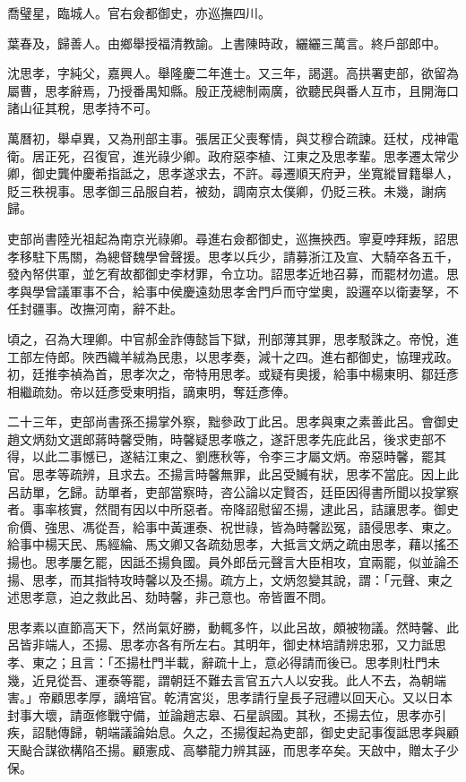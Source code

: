 \begin{pinyinscope}
喬璧星，臨城人。官右僉都御史，亦巡撫四川。

葉春及，歸善人。由鄉舉授福清教諭。上書陳時政，纚纚三萬言。終戶部郎中。

沈思孝，字純父，嘉興人。舉隆慶二年進士。又三年，謁選。高拱署吏部，欲留為屬曹，思孝辭焉，乃授番禺知縣。殷正茂總制兩廣，欲聽民與番人互市，且開海口諸山征其稅，思孝持不可。

萬曆初，舉卓異，又為刑部主事。張居正父喪奪情，與艾穆合疏諫。廷杖，戍神電衛。居正死，召復官，進光祿少卿。政府惡李植、江東之及思孝輩。思孝遷太常少卿，御史龔仲慶希指詆之，思孝遂求去，不許。尋遷順天府尹，坐寬縱冒籍舉人，貶三秩視事。思孝御三品服自若，被劾，調南京太僕卿，仍貶三秩。未幾，謝病歸。

吏部尚書陸光祖起為南京光祿卿。尋進右僉都御史，巡撫挾西。寧夏哱拜叛，詔思孝移駐下馬關，為總督魏學曾聲援。思孝以兵少，請募浙江及宣、大騎卒各五千，發內帑供軍，並乞宥故都御史李材罪，令立功。詔思孝近地召募，而罷材勿遣。思孝與學曾議軍事不合，給事中侯慶遠劾思孝舍門戶而守堂奧，設邏卒以衛妻孥，不任封疆事。改撫河南，辭不赴。

頃之，召為大理卿。中官郝金詐傳懿旨下獄，刑部薄其罪，思孝駁誅之。帝悅，進工部左侍郎。陜西織羊絨為民患，以思孝奏，減十之四。進右都御史，協理戎政。初，廷推李禎為首，思孝次之，帝特用思孝。或疑有奧援，給事中楊東明、鄒廷彥相繼疏劾。帝以廷彥受東明指，謫東明，奪廷彥俸。

二十三年，吏部尚書孫丕揚掌外察，黜參政丁此呂。思孝與東之素善此呂。會御史趙文炳劾文選郎蔣時馨受賄，時馨疑思孝嗾之，遂訐思孝先庇此呂，後求吏部不得，以此二事憾已，遂結江東之、劉應秋等，令李三才屬文炳。帝惡時馨，罷其官。思孝等疏辨，且求去。丕揚言時馨無罪，此呂受贓有狀，思孝不當庇。因上此呂訪單，乞歸。訪單者，吏部當察時，咨公論以定賢否，廷臣因得書所聞以投掌察者。事率核實，然間有因以中所惡者。帝降詔慰留丕揚，逮此呂，詰讓思孝。御史俞價、強思、馮從吾，給事中黃運泰、祝世祿，皆為時馨訟冤，語侵思孝、東之。給事中楊天民、馬經綸、馬文卿又各疏劾思孝，大抵言文炳之疏由思孝，藉以搖丕揚也。思孝屢乞罷，因詆丕揚負國。員外郎岳元聲言大臣相攻，宜兩罷，似並論丕揚、思孝，而其指特攻時馨以及丕揚。疏方上，文炳忽變其說，謂：「元聲、東之述思孝意，迫之救此呂、劾時馨，非己意也。帝皆置不問。

思孝素以直節高天下，然尚氣好勝，動輒多忤，以此呂故，頗被物議。然時馨、此呂皆非端人，丕揚、思孝亦各有所左右。其明年，御史林培請辨忠邪，又力詆思孝、東之；且言：「丕揚杜門半載，辭疏十上，意必得請而後已。思孝則杜門未幾，近見從吾、運泰等罷，謂朝廷不難去言官五六人以安我。此人不去，為朝端害。」帝顧思孝厚，謫培官。乾清宮災，思孝請行皇長子冠禮以回天心。又以日本封事大壞，請亟修戰守備，並論趙志皋、石星誤國。其秋，丕揚去位，思孝亦引疾，詔馳傳歸，朝端議論始息。久之，丕揚復起為吏部，御史史記事復詆思孝與顧天颭合謀欲構陷丕揚。顧憲成、高攀龍力辨其誣，而思孝卒矣。天啟中，贈太子少保。


\end{pinyinscope}
